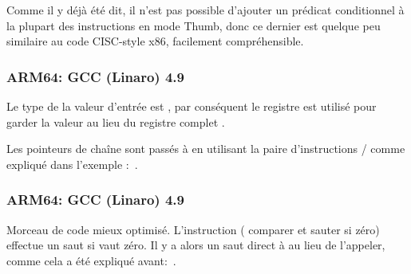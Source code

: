 
Comme il y déjà été dit, il n'est pas possible d'ajouter un prédicat conditionnel
à la plupart des instructions en mode Thumb, donc ce dernier est quelque peu similaire
au code \ac{CISC}-style x86, facilement compréhensible.

\subsubsection{ARM64: GCC (Linaro) 4.9 \NonOptimizing}



Le type de la valeur d'entrée est \Tint, par conséquent le registre  est
utilisé pour garder la valeur au lieu du registre complet .

Les pointeurs de chaîne sont passés à \puts en utilisant la paire d'instructions
/ comme expliqué dans l'exemple \q{\HelloWorldSectionName}:~.

\subsubsection{ARM64: GCC (Linaro) 4.9 \Optimizing}



Morceau de code mieux optimisé.
L'instruction  ( comparer et sauter si zéro)
effectue un saut si  vaut zéro.
Il y a alors un saut direct à \puts au lieu de l'appeler, comme cela a été expliqué
avant:~.
